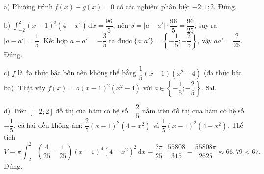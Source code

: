 \begin{ex}
{a) Phương trình $f(x)-g(x)=0$ có các nghiệm phân biệt $-2;1;2$. Đúng.

b) $\displaystyle\int_{-2}^{2}(x-1)^2(4-x^2)\,\mathrm dx=\dfrac{96}5$, nên $S=|a-a'|\cdot\dfrac{96}5=\dfrac{96}{25}$, suy ra $|a-a'|=\dfrac15$. Kết hợp $a+a'=-\dfrac35$ ta được $\{a;a'\}=\left\{-\dfrac15;-\dfrac25\right\}$, vậy $aa'=\dfrac2{25}$. Đúng.

c) $f$ là đa thức bậc bốn nên không thể bằng $\dfrac15(x-1)(x^2-4)$ (đa thức bậc ba). Thật vậy $f(x)=a(x-1)^2(x^2-4)$ với $a\in\left\{-\dfrac15;-\dfrac25\right\}$. Sai.

d) Trên $[-2;2]$ đồ thị của hàm có hệ số $-\dfrac25$ nằm trên đồ thị của hàm có hệ số $-\dfrac15$, cả hai đều không âm: $\dfrac25(x-1)^2(4-x^2)$ và $\dfrac15(x-1)^2(4-x^2)$. Thể tích
\[V=\pi\int_{-2}^{2}\left(\dfrac4{25}-\dfrac1{25}\right)(x-1)^4(4-x^2)^2\,\mathrm dx=\dfrac{3\pi}{25}\cdot\dfrac{55808}{315}=\dfrac{55808\pi}{2625}\approx66{,}79<67.\]
Đúng.}
\end{ex}
